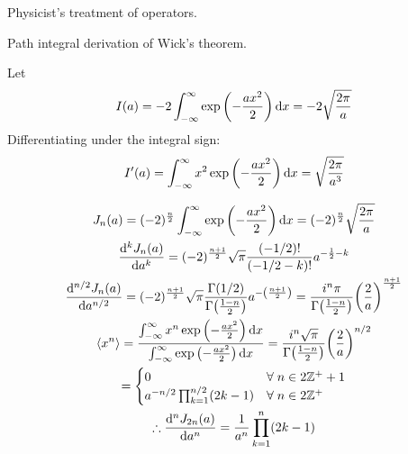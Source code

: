 \documentclass{report}
\begin{document}
\begin{subquests}
	\item Physicist's treatment of operators.

	\item Path integral derivation of Wick's theorem.
	\begin{subquests}
		\item Let
		\begin{gather*}
			I(a) = -2\int_{-\infty}^{\infty}\exp\pqty{-\frac{ax^2}{2}} \dd{x} = -2\sqrt{\frac{2\pi}{a}}
		\end{gather*}
		Differentiating under the integral sign:
		\begin{gather*}
			I'(a) = \int_{-\infty}^{\infty}x^2\exp\pqty{-\frac{ax^2}{2}} \dd{x} = \sqrt{\frac{2\pi}{a^3}}
		\end{gather*}

		\item 
		\begin{gather*}
			J_n(a) = (-2)^\frac{n}{2} \int_{-\infty}^{\infty}\exp\pqty{-\frac{ax^2}{2}} \dd{x} = (-2)^{\frac{n}{2}}\sqrt{\frac{2\pi}{a}} \\
			\dv[k]{J_n(a)}{a} = (-2)^{\frac{n+1}{2}}\sqrt{\pi}\frac{(-1/2)!}{(-1/2-k)!}a^{-\frac{1}{2}-k} \\
			\dv[n/2]{J_n(a)}{a} = (-2)^{\frac{n+1}{2}}\sqrt{\pi}\frac{\Gamma(1/2)}{\Gamma\pqty{\frac{1-n}{2}}} a^{-\pqty{\frac{n+1}{2}}} = \frac{i^n \pi}{\Gamma\pqty{\frac{1-n}{2}}}\pqty{\frac{2}{a}}^{\frac{n+1}{2}} \\
			\expval{x^n} = \frac{\int_{-\infty}^{\infty}x^n\exp\pqty{-\frac{ax^2}{2}} \dd{x}}{\int_{-\infty}^{\infty}\exp\pqty{-\frac{ax^2}{2}} \dd{x}} = \frac{i^n \sqrt{\pi}}{\Gamma\pqty{\frac{1-n}{2}}}\pqty{\frac{2}{a}}^{n/2} \\
			= \begin{cases} 0 & \forall\;n \in 2\mathbb{Z^+} + 1 \\ a^{-n/2}\prod_{k = 1}^{n/2}(2k-1) & \forall\;n \in 2\mathbb{Z^+} \end{cases} \\
			\therefore \dv[n]{J_{2n}(a)}{a} = \frac{1}{a^n}\prod_{k=1}^{n}(2k-1)
		\end{gather*}
	\end{subquests}
\end{subquests}
% 	
% 		
\end{document}
